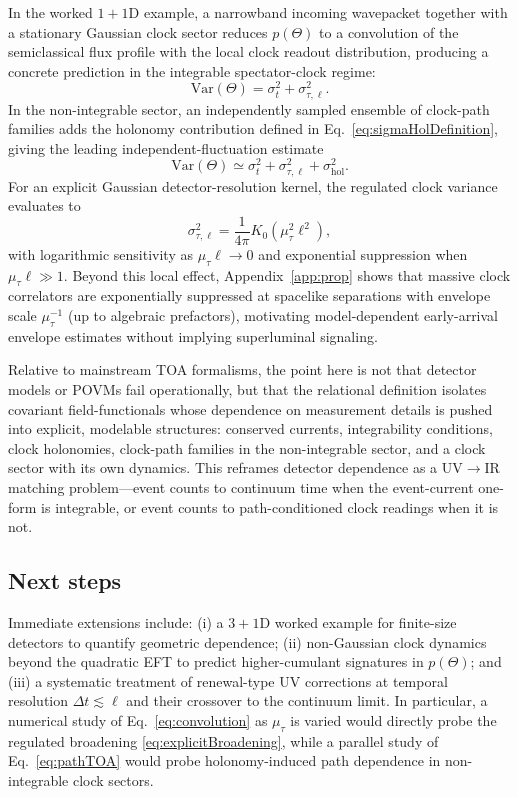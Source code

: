\documentclass[pdflatex,sn-mathphys-num]{sn-jnl}
\theoremstyle{thmstylethree}
\theoremstyle{thmstyleone}
\theoremstyle{thmstyletwo}
\numberwithin{equation}{section}
\begin{document}
    In the worked $1+1$D example, a narrowband incoming wavepacket together with a stationary Gaussian clock sector reduces $p(\Theta)$ to a convolution of the semiclassical flux profile with the local clock readout distribution, producing a concrete prediction in the integrable spectator-clock regime:
    \begin{equation}
        \mathrm{Var}(\Theta)=\sigma_t^2+\sigma_{\tau,\ell}^2.
    \end{equation}
    In the non-integrable sector, an independently sampled ensemble of clock-path families adds the holonomy contribution defined in Eq.~\eqref{eq:sigmaHolDefinition}, giving the leading independent-fluctuation estimate
    \begin{equation}
        \mathrm{Var}(\Theta)\simeq
        \sigma_t^2+\sigma_{\tau,\ell}^2+\sigma_{\mathrm{hol}}^2 .
    \end{equation}
    For an explicit Gaussian detector-resolution kernel, the regulated clock variance evaluates to
    \begin{equation}
        \sigma_{\tau,\ell}^2=
        \frac{1}{4\pi}K_0(\mu_\tau^2\ell^2),
    \end{equation}
    with logarithmic sensitivity as $\mu_\tau\ell\to0$ and exponential suppression when $\mu_\tau\ell\gg1$. Beyond this local effect, Appendix~\ref{app:prop} shows that massive clock correlators are exponentially suppressed at spacelike separations with envelope scale $\mu_\tau^{-1}$ (up to algebraic prefactors), motivating model-dependent early-arrival envelope estimates without implying superluminal signaling.
    
    Relative to mainstream TOA formalisms, the point here is not that detector models or POVMs fail operationally, but that the relational definition isolates covariant field-functionals whose dependence on measurement details is pushed into explicit, modelable structures: conserved currents, integrability conditions, clock holonomies, clock-path families in the non-integrable sector, and a clock sector with its own dynamics. This reframes detector dependence as a UV$\rightarrow$IR matching problem---event counts to continuum time when the event-current one-form is integrable, or event counts to path-conditioned clock readings when it is not.
    
    \subsection*{Next steps}
        Immediate extensions include: (i) a $3+1$D worked example for finite-size detectors to quantify geometric dependence; (ii) non-Gaussian clock dynamics beyond the quadratic EFT to predict higher-cumulant signatures in $p(\Theta)$; and (iii) a systematic treatment of renewal-type UV corrections at temporal resolution $\Delta t\lesssim \ell$ and their crossover to the continuum limit. In particular, a numerical study of Eq.~\eqref{eq:convolution} as $\mu_\tau$ is varied would directly probe the regulated broadening \eqref{eq:explicitBroadening}, while a parallel study of Eq.~\eqref{eq:pathTOA} would probe holonomy-induced path dependence in non-integrable clock sectors.
\end{document}

